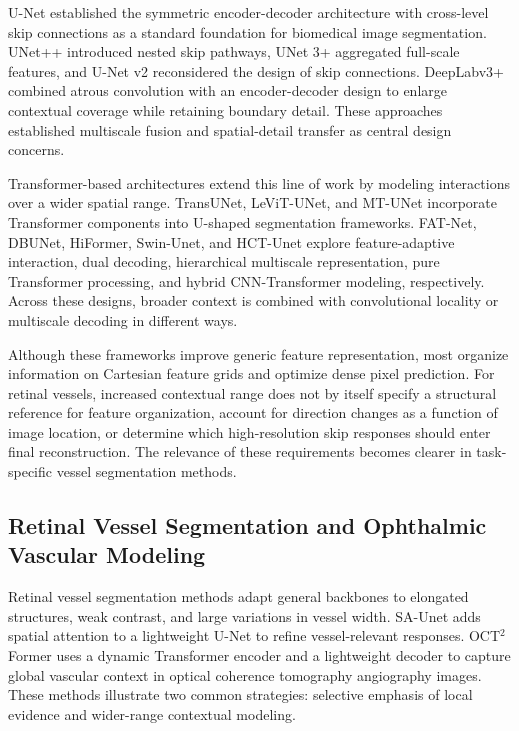 \documentclass[a4paper,fleqn]{cas-sc}
\begin{document}
U-Net established the symmetric encoder-decoder architecture with cross-level skip connections as a standard foundation for biomedical image segmentation\cite{ronneberger2015u}.
UNet++ introduced nested skip pathways, UNet 3+ aggregated full-scale features, and U-Net v2 reconsidered the design of skip connections\cite{zhou2018unet++,huang2020unet,peng2025u}.
DeepLabv3+ combined atrous convolution with an encoder-decoder design to enlarge contextual coverage while retaining boundary detail\cite{chen2018encoder}.
These approaches established multiscale fusion and spatial-detail transfer as central design concerns.

Transformer-based architectures extend this line of work by modeling interactions over a wider spatial range.
TransUNet, LeViT-UNet, and MT-UNet incorporate Transformer components into U-shaped segmentation frameworks\cite{chen2024transunet,xu2023levit,wang2022mixed}.
FAT-Net, DBUNet, HiFormer, Swin-Unet, and HCT-Unet explore feature-adaptive interaction, dual decoding, hierarchical multiscale representation, pure Transformer processing, and hybrid CNN-Transformer modeling, respectively\cite{wu2022fat,wang2023dual,heidari2023hiformer,cao2022swin,fan2025hct}.
Across these designs, broader context is combined with convolutional locality or multiscale decoding in different ways.

Although these frameworks improve generic feature representation, most organize information on Cartesian feature grids and optimize dense pixel prediction.
For retinal vessels, increased contextual range does not by itself specify a structural reference for feature organization, account for direction changes as a function of image location, or determine which high-resolution skip responses should enter final reconstruction.
The relevance of these requirements becomes clearer in task-specific vessel segmentation methods.

\subsection{Retinal Vessel Segmentation and Ophthalmic Vascular Modeling}

Retinal vessel segmentation methods adapt general backbones to elongated structures, weak contrast, and large variations in vessel width.
SA-Unet adds spatial attention to a lightweight U-Net to refine vessel-relevant responses\cite{guo2021sa}.
OCT$^2$Former uses a dynamic Transformer encoder and a lightweight decoder to capture global vascular context in optical coherence tomography angiography images\cite{tan2023oct2former}.
These methods illustrate two common strategies: selective emphasis of local evidence and wider-range contextual modeling.
\end{document}
